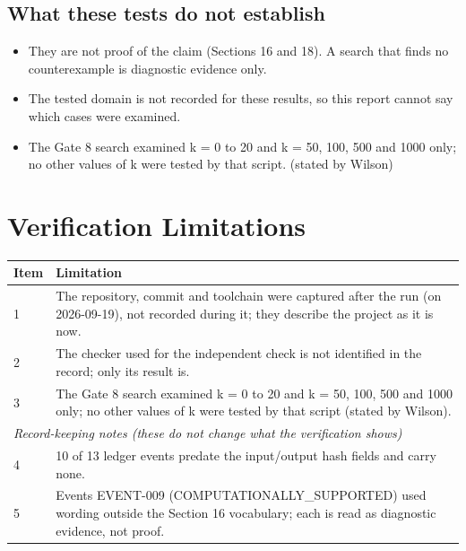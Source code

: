 \documentclass[11pt]{article}
\begin{document}
\subsection*{What these tests do not establish}
\begin{itemize}
\item They are not proof of the claim (Sections 16 and 18). A search that finds no counterexample is diagnostic evidence only.
\item The tested domain is not recorded for these results, so this report cannot say which cases were examined.
\item The Gate 8 search examined k = 0 to 20 and k = 50, 100, 500 and 1000 only; no other values of k were tested by that script. (stated by Wilson)
\end{itemize}
\section{Verification Limitations}
\begin{longtable}{p{}p{}}
\toprule Item & Limitation \\ \midrule \endhead
1 & The repository, commit and toolchain were captured after the run (on 2026-09-19), not recorded during it; they describe the project as it is now. \\
2 & The checker used for the independent check is not identified in the record; only its result is. \\
3 & The Gate 8 search examined k = 0 to 20 and k = 50, 100, 500 and 1000 only; no other values of k were tested by that script (stated by Wilson). \\
\midrule \multicolumn{2}{l}{\textit{Record-keeping notes (these do not change what the verification shows)}} \\ \midrule
4 & 10 of 13 ledger events predate the input/output hash fields and carry none. \\
5 & Events EVENT-009 (COMPUTATIONALLY\_SUPPORTED) used wording outside the Section 16 vocabulary; each is read as diagnostic evidence, not proof. \\
\bottomrule
\end{longtable}
\end{document}
